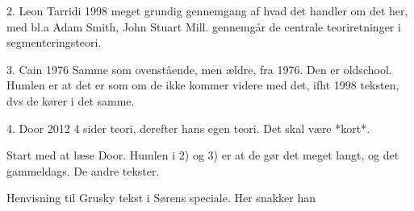 2. Leon Tarridi 1998
meget grundig gennemgang af hvad det handler om det her, med bl.a Adam Smith, John Stuart Mill. gennemgår de centrale teoriretninger i segmenteringsteori.

3. Cain 1976
Samme som ovenstående, men ældre, fra 1976. Den er oldschool. Humlen er at det er som om de ikke kommer videre med det, ifht 1998 teksten, dvs de kører i det samme.

4. Door 2012
4 sider teori, derefter hans egen teori. Det skal være *kort*.

Start med at læse Door. Humlen i 2) og 3) er at de gør det meget langt, og det gammeldags. De andre tekster.

Henvisning til Grusky tekst i Sørens speciale. Her snakker han 





































